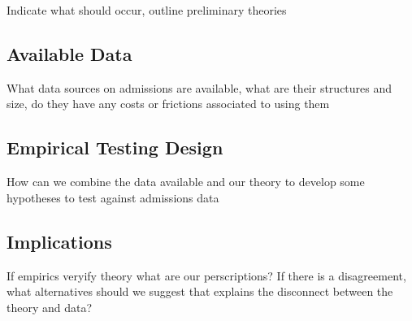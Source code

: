 \documentclass[10pt]{article}
\begin{document}
{\color{red} Indicate what should occur, outline preliminary theories}

\subsection*{Available Data}

{\color{red} What data sources on admissions are available, what are their structures and size, do they have any costs or frictions associated to using them}

\subsection*{Empirical Testing Design}

{\color{red} How can we combine the data available and our theory to develop some hypotheses to test against admissions data}

\subsection*{Implications}

{\color{red} If empirics veryify theory what are our perscriptions? If there is a disagreement, what alternatives should we suggest that explains the disconnect between the theory and data?}

%
\end{document}
